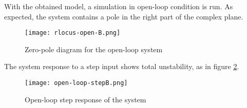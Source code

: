 With the obtained model, a simulation in open-loop condition is run. As expected, the system contains a pole in the right part of the complex plane.

\begin{figure}[h]
	\centering
	\texttt{[image: rlocus-open-B.png]}
	\caption{Zero-pole diagram for the open-loop system}\label{fig:zpB}
\end{figure}

The system response to a step input shows total unstability, as in figure \ref{fig:stepB}.

\begin{figure}[h]
	\centering
	\texttt{[image: open-loop-stepB.png]}
	\caption{Open-loop step response of the system}\label{fig:stepB}
\end{figure}
